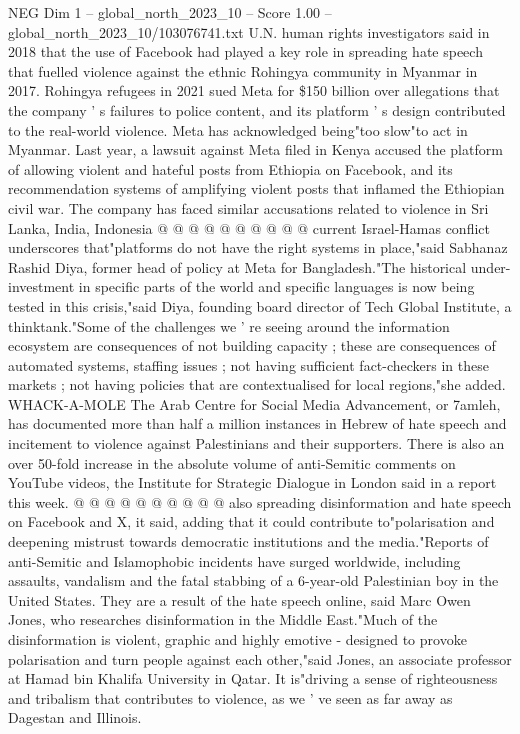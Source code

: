 \begin{textsample}{NEG Dim 1 – global\_north\_2023\_10 – Score 1.00 – global\_north\_2023\_10/103076741.txt}
U.N. human rights investigators said in 2018 that the use of Facebook had played a key role in spreading hate speech that fuelled violence against the ethnic Rohingya community in Myanmar in 2017.
Rohingya refugees in 2021 sued Meta for \$150 billion over allegations that the company ' s failures to police content, and its platform ' s design contributed to the real-world violence.
Meta has acknowledged being"too slow"to act in Myanmar.
Last year, a lawsuit against Meta filed in Kenya accused the platform of allowing violent and hateful posts from Ethiopia on Facebook, and its recommendation systems of amplifying violent posts that inflamed the Ethiopian civil war.
The company has faced similar accusations related to violence in Sri Lanka, India, Indonesia @ @ @ @ @ @ @ @ @ @ current Israel-Hamas conflict underscores that"platforms do not have the right systems in place,"said Sabhanaz Rashid Diya, former head of policy at Meta for Bangladesh."The historical under-investment in specific parts of the world and specific languages is now being tested in this crisis,"said Diya, founding board director of Tech Global Institute, a thinktank."Some of the challenges we ' re seeing around the information ecosystem are consequences of not building capacity ; these are consequences of automated systems, staffing issues ; not having sufficient fact-checkers in these markets ; not having policies that are contextualised for local regions,"she added.
WHACK-A-MOLE The Arab Centre for Social Media Advancement, or 7amleh, has documented more than half a million instances in Hebrew of hate speech and incitement to violence against Palestinians and their supporters.
There is also an over 50-fold increase in the absolute volume of anti-Semitic comments on YouTube videos, the Institute for Strategic Dialogue in London said in a report this week. @ @ @ @ @ @ @ @ @ @ also spreading disinformation and hate speech on Facebook and X, it said, adding that it could contribute to"polarisation and deepening mistrust towards democratic institutions and the media."Reports of anti-Semitic and Islamophobic incidents have surged worldwide, including assaults, vandalism and the fatal stabbing of a 6-year-old Palestinian boy in the United States.
They are a result of the hate speech online, said Marc Owen Jones, who researches disinformation in the Middle East."Much of the disinformation is violent, graphic and highly emotive - designed to provoke polarisation and turn people against each other,"said Jones, an associate professor at Hamad bin Khalifa University in Qatar.
It is"driving a sense of righteousness and tribalism that contributes to violence, as we ' ve seen as far away as Dagestan and Illinois.

\end{textsample}
